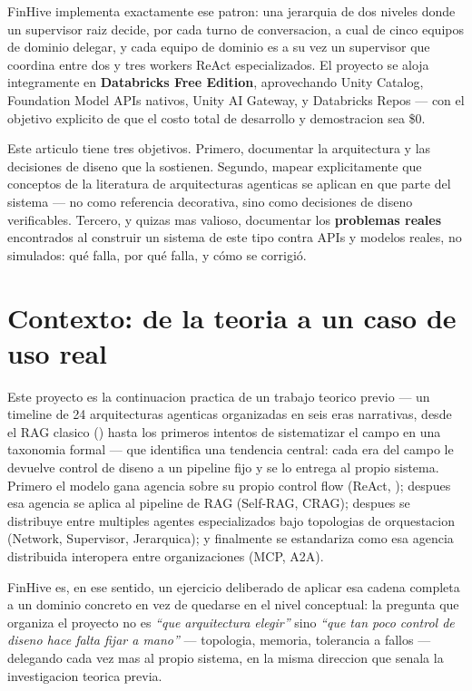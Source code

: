 \documentclass[11pt]{article}
\begin{document}
FinHive implementa exactamente ese patron: una jerarquia de dos niveles donde
un supervisor raiz decide, por cada turno de conversacion, a cual de cinco
equipos de dominio delegar, y cada equipo de dominio es a su vez un
supervisor que coordina entre dos y tres workers ReAct especializados. El
proyecto se aloja integramente en \textbf{Databricks Free Edition}, aprovechando
Unity Catalog, Foundation Model APIs nativos, Unity AI Gateway, y Databricks
Repos --- con el objetivo explicito de que el costo total de desarrollo y
demostracion sea \$0.

Este articulo tiene tres objetivos. Primero, documentar la arquitectura y las
decisiones de diseno que la sostienen. Segundo, mapear explicitamente que
conceptos de la literatura de arquitecturas agenticas se aplican en que parte
del sistema --- no como referencia decorativa, sino como decisiones de diseno
verificables. Tercero, y quizas mas valioso, documentar los \textbf{problemas
reales} encontrados al construir un sistema de este tipo contra APIs y
modelos reales, no simulados: qué falla, por qué falla, y cómo se corrigió.

\section{Contexto: de la teoria a un caso de uso real}

Este proyecto es la continuacion practica de un trabajo teorico previo
--- un timeline de 24 arquitecturas agenticas organizadas en seis eras
narrativas, desde el RAG clasico (\cite{lewis2020}) hasta los primeros
intentos de sistematizar el campo en una taxonomia formal --- que identifica
una tendencia central: cada era del campo le devuelve control de diseno a un
pipeline fijo y se lo entrega al propio sistema. Primero el modelo gana
agencia sobre su propio control flow (ReAct, \cite{yao2023}); despues esa
agencia se aplica al pipeline de RAG (Self-RAG, CRAG); despues se distribuye
entre multiples agentes especializados bajo topologias de orquestacion
(Network, Supervisor, Jerarquica); y finalmente se estandariza como esa
agencia distribuida interopera entre organizaciones (MCP, A2A).

FinHive es, en ese sentido, un ejercicio deliberado de aplicar esa cadena
completa a un dominio concreto en vez de quedarse en el nivel conceptual: la
pregunta que organiza el proyecto no es \emph{``que arquitectura elegir''}
sino \emph{``que tan poco control de diseno hace falta fijar a mano''} ---
topologia, memoria, tolerancia a fallos --- delegando cada vez mas al propio
sistema, en la misma direccion que senala la investigacion teorica previa.
\end{document}
